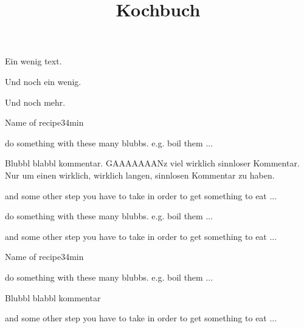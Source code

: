\documentclass[ngerman]{article}
\title{Kochbuch}
\begin{document}
\maketitle

Ein wenig text.\par
\noindent Und noch ein wenig.
\par\par
Und noch mehr.




\begin{recipe}{Name of recipe}{3}{4min}
\begin{step}{do something with these many blubbs. e.g. boil them ...}
\end{step}
Blubbl blabbl kommentar. GAAAAAAANz viel wirklich sinnloser Kommentar.
Nur um einen wirklich, wirklich langen, sinnlosen Kommentar zu haben.
\begin{step}{and some other step you have to take in order to get
    something to eat ...}
\end{step}
\begin{step}{do something with these many blubbs. e.g. boil them ...}
\end{step}
\begin{step}{and some other step you have to take in order to get
    something to eat ...}
\end{step}
\end{recipe}


\begin{recipe}{Name of recipe}{3}{4min}
\begin{step}{do something with these many blubbs. e.g. boil them ...}
\end{step}
Blubbl blabbl kommentar
\begin{step}{and some other step you have to take in order to get
    something to eat ...}
\end{step}
\end{recipe}


\end{document}
